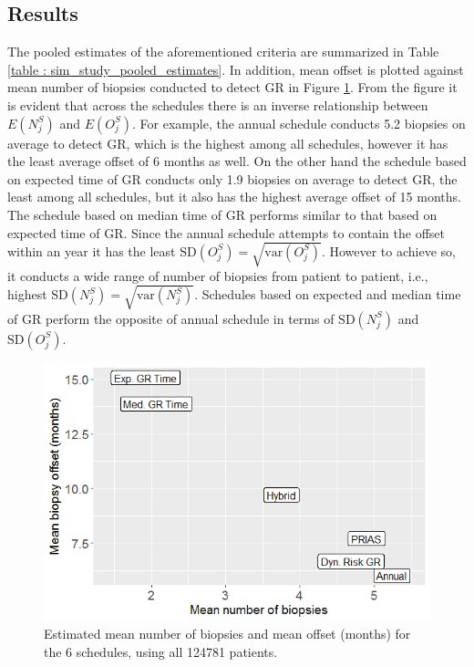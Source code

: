 \subsection{Results}
The pooled estimates of the aforementioned criteria are summarized in Table \ref{table : sim_study_pooled_estimates}. In addition, mean offset is plotted against mean number of biopsies conducted to detect GR in Figure \ref{fig : meanNbVsOffset}. From the figure it is evident that across the schedules there is an inverse relationship between $E(N^S_j)$ and $E(O^S_j)$. For example, the annual schedule conducts 5.2 biopsies on average to detect GR, which is the highest among all schedules, however it has the least average offset of 6 months as well. On the other hand the schedule based on expected time of GR conducts only 1.9 biopsies on average to detect GR, the least among all schedules, but it also has the highest average offset of 15 months. The schedule based on median time of GR performs similar to that based on expected time of GR. Since the annual schedule attempts to contain the offset within an year it has the least $\mbox{SD}(O^S_j) = \sqrt{\mbox{var}(O^S_j)}$. However to achieve so, it conducts a wide range of number of biopsies from patient to patient, i.e., highest $\mbox{SD}(N^S_j) = \sqrt{\mbox{var}(N^S_j)}$. Schedules based on expected and median time of GR perform the opposite of annual schedule in terms of $\mbox{SD}(N^S_j)$ and $\mbox{SD}(O^S_j)$.

\begin{figure}
\centerline{\includegraphics[width=\columnwidth]{images/sim_study/meanNbVsOffset_all.png}}
\caption{Estimated mean number of biopsies and mean offset (months) for the 6 schedules, using all 124781 patients.}
\label{fig : meanNbVsOffset}
\end{figure}

